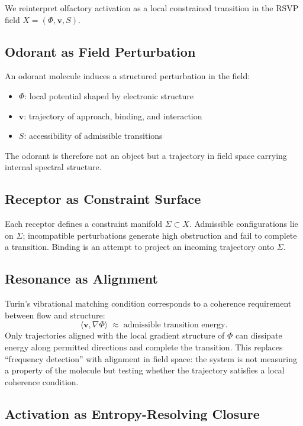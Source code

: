 \documentclass[12pt,a4paper]{article}
\begin{document}
We reinterpret olfactory activation as a local constrained transition in the RSVP field $X = (\Phi, \mathbf{v}, S)$.

\subsection{Odorant as Field Perturbation}

An odorant molecule induces a structured perturbation in the field:
\begin{itemize}
\item $\Phi$: local potential shaped by electronic structure
\item $\mathbf{v}$: trajectory of approach, binding, and interaction
\item $S$: accessibility of admissible transitions
\end{itemize}

The odorant is therefore not an object but a trajectory in field space carrying internal spectral structure.

\subsection{Receptor as Constraint Surface}

Each receptor defines a constraint manifold $\Sigma \subset X$. Admissible configurations lie on $\Sigma$; incompatible perturbations generate high obstruction and fail to complete a transition. Binding is an attempt to project an incoming trajectory onto $\Sigma$.

\subsection{Resonance as Alignment}

Turin's vibrational matching condition corresponds to a coherence requirement between flow and structure:
\[
\langle \mathbf{v}, \nabla\Phi \rangle \;\approx\; \text{admissible transition energy}.
\]
Only trajectories aligned with the local gradient structure of $\Phi$ can dissipate energy along permitted directions and complete the transition. This replaces ``frequency detection'' with alignment in field space: the system is not measuring a property of the molecule but testing whether the trajectory satisfies a local coherence condition.

\subsection{Activation as Entropy-Resolving Closure}
\end{document}
